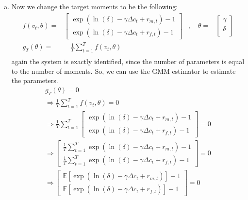 \begin{enumerate}[(a)]
      \item Now we change the target moments to be the following:
      \begin{equation*}
        \begin{aligned}
          f(v_t,\theta) = & \begin{bmatrix}
            \exp(\ln(\delta) - \gamma\Delta c_t + r_{m,t})-1 \\
            \exp(\ln(\delta) - \gamma\Delta c_t + r_{f,t})-1
          \end{bmatrix} & , \quad 
          \theta = & \begin{bmatrix}
            \gamma \\
            \delta \\
          \end{bmatrix}  \\
          g_T(\theta) = & \quad \frac{1}{T} \sum_{t=1}^T f(v_t,\theta) & \\
        \end{aligned}
        \end{equation*}
        again the system is exactly identified, since the number of parameters is equal to the number of moments. So, we can use the GMM estimator to estimate the parameters.
        \begin{gather*}
          g_T(\theta) = 0\\
          \Rightarrow\frac{1}{T} \sum_{t=1}^T f(v_t,\theta) = 0\\
          \Rightarrow\frac{1}{T} \sum_{t=1}^T \begin{bmatrix}
            \exp(\ln(\delta) - \gamma\Delta c_t + r_{m,t})-1 \\
            \exp(\ln(\delta) - \gamma\Delta c_t + r_{f,t})-1
          \end{bmatrix} = 0\\
          \Rightarrow \begin{bmatrix}
            \frac{1}{T} \sum_{t=1}^T \exp(\ln(\delta) - \gamma\Delta c_t + r_{m,t})-1 \\
            \frac{1}{T} \sum_{t=1}^T \exp(\ln(\delta) - \gamma\Delta c_t + r_{f,t})-1
          \end{bmatrix} = 0\\
          \Rightarrow \begin{bmatrix}
            \mathbb{E} [\exp(\ln(\delta) - \gamma\Delta c_t + r_{m,t})]-1 \\
            \mathbb{E} [\exp(\ln(\delta) - \gamma\Delta c_t + r_{f,t})]-1
          \end{bmatrix} = 0
        \end{gather*}


\end{enumerate}
